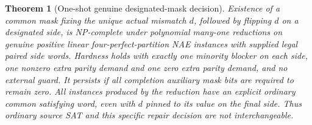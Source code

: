 \documentclass[11pt]{article}
\newtheorem{theorem}{Theorem}
\begin{document}
\begin{theorem}[One-shot genuine designated-mask decision]\label{thm:bd17-mask}
Existence of a common mask fixing the unique actual mismatch $d$, followed by flipping $d$ on a designated side, is NP-complete under polynomial many-one reductions on genuine positive linear four-perfect-partition NAE instances with supplied legal paired side words. Hardness holds with exactly one minority blocker on each side, one nonzero extra parity demand and one zero extra parity demand, and no external guard. It persists if all completion auxiliary mask bits are required to remain zero. All instances produced by the reduction have an explicit ordinary common satisfying word, even with $d$ pinned to its value on the final side. Thus ordinary source SAT and this specific repair decision are not interchangeable.
\end{theorem}
\end{document}

